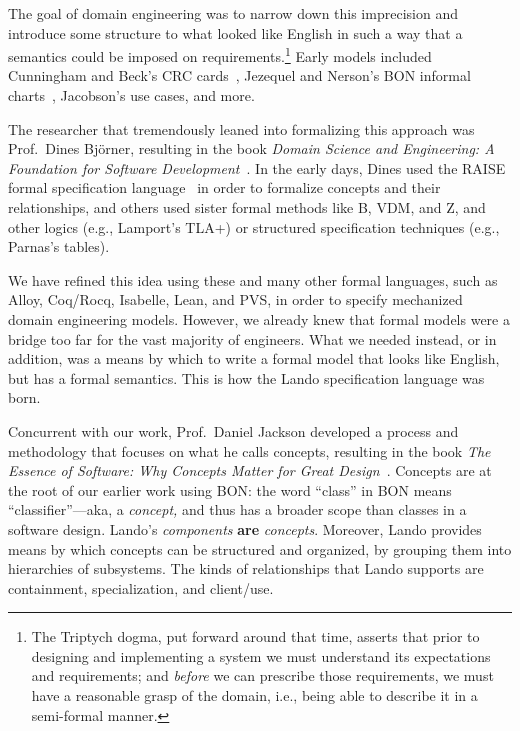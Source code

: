 \documentclass[10pt,letterpaper]{article}
\begin{document}
The goal of domain engineering was to narrow down this imprecision and introduce some structure to what looked like English in such a way that a semantics could be imposed on requirements.\footnote{The Triptych dogma, put forward around that time, asserts that prior to designing and implementing a system we must understand its expectations and requirements; and \emph{before} we can prescribe those requirements, we must have a reasonable grasp of the domain, i.e., being able to describe it in a semi-formal manner.} Early models included Cunningham and Beck's CRC cards~\cite{JanotaEtAlCLOPSDSL2009}, Jezequel and Nerson's BON informal charts~\cite{NersonApplyingObjectoriented1992}, Jacobson's use cases, and more.

The researcher that tremendously leaned into formalizing this approach was Prof.~Dines Björner, resulting in the book \emph{Domain Science and Engineering: A Foundation for Software Development}~\cite{BjornerDomainScience2021}. In the early days, Dines used the RAISE formal specification language~\cite{BjornerMostlyDines} in order to formalize concepts and their relationships, and others used sister formal methods like B, VDM, and Z, and other logics (e.g., Lamport's TLA+) or structured specification techniques (e.g., Parnas's tables).

We have refined this idea using these and many other formal languages, such as Alloy, Coq/Rocq, Isabelle, Lean, and PVS, in order to specify mechanized domain engineering models. However, we already knew that formal models were a bridge too far for the vast majority of engineers. What we needed instead, or in addition, was a means by which to write a formal model that looks like English, but has a formal semantics. This is how the Lando specification language was born.

Concurrent with our work, Prof.~Daniel Jackson developed a process and methodology that focuses on what he calls concepts, resulting in the book \emph{The Essence of Software: Why Concepts Matter for Great Design}~\cite{JacksonEssenceSoftware2021}. Concepts are at the root of our earlier work using BON: the word ``class'' in BON means ``classifier''---aka, a \emph{concept,} and thus has a broader scope than classes in a software design. Lando's \emph{components} \textbf{are} \emph{concepts}. Moreover, Lando provides means by which concepts can be structured and organized, by grouping them into hierarchies of subsystems. The kinds of relationships that Lando supports are containment, specialization, and client/use.
\end{document}

